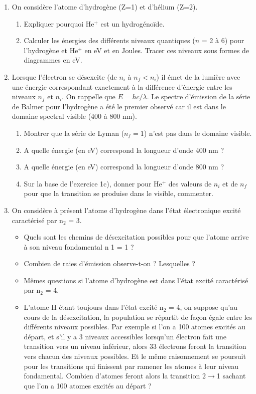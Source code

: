 \begin{enumerate}[\bf 1)]
\item On consid\`ere l'atome d'hydrog\`ene (Z=1) et d'h\'elium (Z=2).
\begin{enumerate}
\item Expliquer pourquoi He$^+$ est un hydrog\'eno\"ide.
\item Calculer les \'energies des diff\'erents niveaux quantiques ($n$ = 2 \`a 6) pour l'hydrog\`ene et He$^+$
en eV et en Joules. Tracer ces niveaux sous formes de diagrammes en eV.
\end{enumerate}

\item Lorsque l'\'electron se d\'esexcite (de $n_i$ \`a $n_f < n_i$) il \'emet de la lumi\`ere avec
une \'energie correspondant exactement \`a la diff\'erence d'\'energie entre les niveaux $n_f$ et $n_i$.
On rappelle que $E=hc/\lambda$. Le spectre d'\'emission de la s\'erie de Balmer pour l'hydrog\`ene
a \'et\'e le premier observ\'e car il est dans le domaine spectral visible (400 \`a 800 nm).
\begin{enumerate}
\item Montrer que la s\'erie de Lyman ($n_f =1$) n'est pas dans le domaine visible.
\item A quelle \'energie (en eV) correspond la longueur d'onde 400 nm ?
\item A quelle \'energie (en eV) correspond la longueur d'onde 800 nm ?
\item Sur la base de l'exercice 1c), donner pour He$^+$ des valeurs de $n_i$ et de $n_f$ pour
que la transition se produise dans le visible, commenter.
\end{enumerate}

\item On considère à présent l’atome d’hydrogène dans l’état électronique excité caractérisé par
n$_2$ = 3.
\begin{itemize}
\item Quels sont les chemins de désexcitation possibles pour que l’atome arrive à son niveau
fondamental n 1 = 1 ?
\item Combien de raies d’émission observe-t-on ? Lesquelles ?
\item Mêmes questions si l’atome d’hydrogène est dans l’état excité caractérisé par n$_2$ = 4.
\item L’atome H étant toujours dans l’état excité n$_2$ = 4, on suppose qu’au cours de la
désexcitation, la population se répartit de façon égale entre les différents niveaux
possibles. Par exemple si l’on a 100 atomes excités au départ, et s’il y a 3 niveaux
accessibles lorsqu’un électron fait une transition vers un niveau inférieur, alors 33
électrons feront la transition vers chacun des niveaux possibles. Et le même
raisonnement se poursuit pour les transitions qui finissent par ramener les atomes à
leur niveau fondamental. Combien d’atomes feront alors la transition 2$\rightarrow$1 sachant que
l’on a 100 atomes excités au départ ?
\end{itemize}



\end{enumerate}
